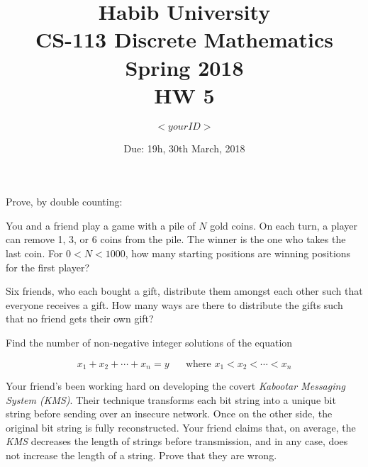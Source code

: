 \documentclass[addpoints]{exam}
\title{Habib University\\CS-113 Discrete Mathematics\\Spring 2018\\HW 5}
\author{$<your ID>$}  %
\date{Due: 19h, 30th March, 2018}
\begin{document}
\maketitle

\begin{questions}



\question
Prove, by double counting:

\question  You and a friend play a game with a pile of $N$ gold coins. On each turn, a player can remove 1, 3, or 6 coins from the pile. The winner is the one who takes the last coin. For $0 < N < 1000$, how many starting positions are winning positions for the first player?


  \begin{solution}
  \end{solution}
  
\question 
Six friends, who each bought a gift, distribute them amongst each other such that everyone receives a gift. How many ways are there to distribute the gifts such that no friend gets their own gift?



  \begin{solution}
  \end{solution}

\question [0]
Find the number of non-negative integer solutions of the equation

\[x_1 + x_2 + \cdots + x_n = y \;\;\;\;\;\;\text{where } x_1 < x_2 < \cdots < x_n\]

    
   \begin{solution}
  \end{solution}

\question 
Your friend's been working hard on developing the covert \textit{Kabootar Messaging System (KMS)}. Their technique transforms each bit string into a unique bit string before sending over an insecure network. Once on the other side, the original bit string is fully reconstructed. Your friend claims that, on average, the \textit{KMS} decreases the length of strings before transmission, and in any case, does not increase the length of a string. Prove that they are wrong.

\end{questions}
\end{document}
